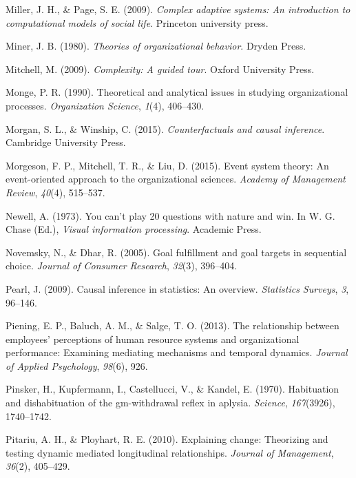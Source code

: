 \documentclass[english,,man]{apa6}
\theoremstyle{definition}
\theoremstyle{definition}
\theoremstyle{definition}
\theoremstyle{remark}
\begin{document}
\leavevmode\hypertarget{ref-miller2009}{}%
Miller, J. H., \& Page, S. E. (2009). \emph{Complex adaptive systems: An
introduction to computational models of social life}. Princeton
university press.

\leavevmode\hypertarget{ref-miner1980}{}%
Miner, J. B. (1980). \emph{Theories of organizational behavior}. Dryden
Press.

\leavevmode\hypertarget{ref-mitchell2009}{}%
Mitchell, M. (2009). \emph{Complexity: A guided tour}. Oxford University
Press.

\leavevmode\hypertarget{ref-monge1990}{}%
Monge, P. R. (1990). Theoretical and analytical issues in studying
organizational processes. \emph{Organization Science}, \emph{1}(4),
406--430.

\leavevmode\hypertarget{ref-morgan2015}{}%
Morgan, S. L., \& Winship, C. (2015). \emph{Counterfactuals and causal
inference}. Cambridge University Press.

\leavevmode\hypertarget{ref-morgeson2015}{}%
Morgeson, F. P., Mitchell, T. R., \& Liu, D. (2015). Event system
theory: An event-oriented approach to the organizational sciences.
\emph{Academy of Management Review}, \emph{40}(4), 515--537.

\leavevmode\hypertarget{ref-newell1973}{}%
Newell, A. (1973). You can't play 20 questions with nature and win. In
W. G. Chase (Ed.), \emph{Visual information processing}. Academic Press.

\leavevmode\hypertarget{ref-novemsky2005}{}%
Novemsky, N., \& Dhar, R. (2005). Goal fulfillment and goal targets in
sequential choice. \emph{Journal of Consumer Research}, \emph{32}(3),
396--404.

\leavevmode\hypertarget{ref-Pearl2009}{}%
Pearl, J. (2009). Causal inference in statistics: An overview.
\emph{Statistics Surveys}, \emph{3}, 96--146.

\leavevmode\hypertarget{ref-piening2013}{}%
Piening, E. P., Baluch, A. M., \& Salge, T. O. (2013). The relationship
between employees' perceptions of human resource systems and
organizational performance: Examining mediating mechanisms and temporal
dynamics. \emph{Journal of Applied Psychology}, \emph{98}(6), 926.

\leavevmode\hypertarget{ref-pinsker1970}{}%
Pinsker, H., Kupfermann, I., Castellucci, V., \& Kandel, E. (1970).
Habituation and dishabituation of the gm-withdrawal reflex in aplysia.
\emph{Science}, \emph{167}(3926), 1740--1742.

\leavevmode\hypertarget{ref-Pitariu2010}{}%
Pitariu, A. H., \& Ployhart, R. E. (2010). Explaining change: Theorizing
and testing dynamic mediated longitudinal relationships. \emph{Journal
of Management}, \emph{36}(2), 405--429.
\end{document}
